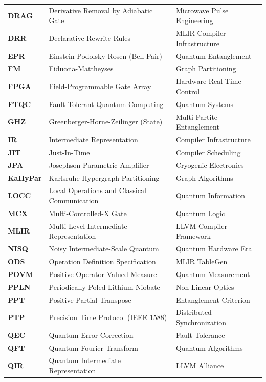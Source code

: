 \begin{xltabular}{\textwidth}{p{2.4cm} p{7.2cm} X}
    \textbf{DRAG} & Derivative Removal by Adiabatic Gate & Microwave Pulse Engineering \\
    \textbf{DRR} & Declarative Rewrite Rules & MLIR Compiler Infrastructure \\
    \textbf{EPR} & Einstein-Podolsky-Rosen (Bell Pair) & Quantum Entanglement \\
    \textbf{FM} & Fiduccia-Mattheyses & Graph Partitioning \\
    \textbf{FPGA} & Field-Programmable Gate Array & Hardware Real-Time Control \\
    \textbf{FTQC} & Fault-Tolerant Quantum Computing & Quantum Systems \\
    \textbf{GHZ} & Greenberger-Horne-Zeilinger (State) & Multi-Partite Entanglement \\
    \textbf{IR} & Intermediate Representation & Compiler Infrastructure \\
    \textbf{JIT} & Just-In-Time & Compiler Scheduling \\
    \textbf{JPA} & Josephson Parametric Amplifier & Cryogenic Electronics \\
    \textbf{KaHyPar} & Karlsruhe Hypergraph Partitioning & Graph Algorithms \\
    \textbf{LOCC} & Local Operations and Classical Communication & Quantum Information \\
    \textbf{MCX} & Multi-Controlled-X Gate & Quantum Logic \\
    \textbf{MLIR} & Multi-Level Intermediate Representation & LLVM Compiler Framework \\
    \textbf{NISQ} & Noisy Intermediate-Scale Quantum & Quantum Hardware Era \\
    \textbf{ODS} & Operation Definition Specification & MLIR TableGen \\
    \textbf{POVM} & Positive Operator-Valued Measure & Quantum Measurement \\
    \textbf{PPLN} & Periodically Poled Lithium Niobate & Non-Linear Optics \\
    \textbf{PPT} & Positive Partial Transpose & Entanglement Criterion \\
    \textbf{PTP} & Precision Time Protocol (IEEE 1588) & Distributed Synchronization \\
    \textbf{QEC} & Quantum Error Correction & Fault Tolerance \\
    \textbf{QFT} & Quantum Fourier Transform & Quantum Algorithms \\
    \textbf{QIR} & Quantum Intermediate Representation & LLVM Alliance \\

\end{xltabular}
